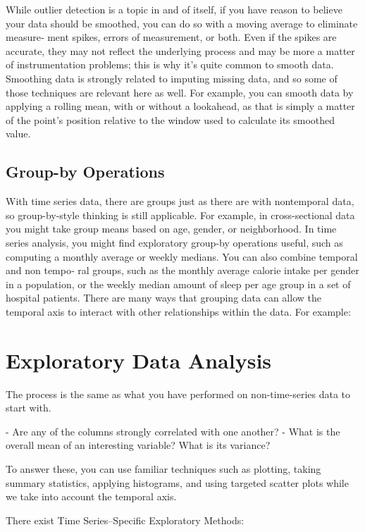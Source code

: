 \documentclass[openany]{book}
\begin{document}
While outlier detection is a topic in and of itself, if you have reason to believe your data should be smoothed, you can do so with a moving average to eliminate measure‐ ment spikes, errors of measurement, or both. Even if the spikes are accurate, they may not reflect the underlying process and may be more a matter of instrumentation problems; this is why it’s quite common to smooth data.
Smoothing data is strongly related to imputing missing data, and so some of those techniques are relevant here as well. For example, you can smooth data by applying a rolling mean, with or without a lookahead, as that is simply a matter of the point’s position relative to the window used to calculate its smoothed value.

\subsection{Group-by Operations}

With time series data, there are groups just as there are with nontemporal data, so group-by-style thinking is still applicable. For example, in cross-sectional data you might take group means based on age, gender, or neighborhood. In time series analysis, you might find exploratory group-by operations useful, such as computing a monthly average or weekly medians. You can also combine temporal and non tempo‐ ral groups, such as the monthly average calorie intake per gender in a population, or the weekly median amount of sleep per age group in a set of hospital patients. There are many ways that grouping data can allow the temporal axis to interact with other relationships within the data. For example:

\section{Exploratory Data Analysis}

The process is the same as what you have performed on non-time-series data to start with.

- Are any of the columns strongly correlated with one another?
- What is the overall mean of an interesting variable? What is its variance?

To answer these, you can use familiar techniques such as plotting, taking summary statistics, applying histograms, and using targeted scatter plots while we take into account the temporal axis. 

There exist Time Series–Specific Exploratory Methods:
\end{document}
